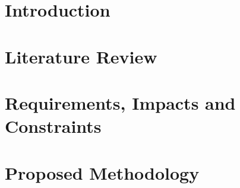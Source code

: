 \documentclass[Times,12pt,oneside,openany,print,index]{report}
\let\cleardoublepage=\clearpage %
\begin{document}
\thispagestyle{empty} %
\cleardoublepage



{}


{}


{}


{}


{}


\renewcommand{\contentsname}{Table of Contents}
\cleardoublepage
{}
{}
\tableofcontents

\listoffigures
\listoftables

\printnomenclature
\cleardoublepage


\chapter{Introduction}
\label{ch:intro}


\chapter{Literature Review}
\label{ch:literature}


\chapter{Requirements, Impacts and Constraints}
\label{ch:requirements}


\chapter{Proposed Methodology}
\label{ch:method}

\end{document}
